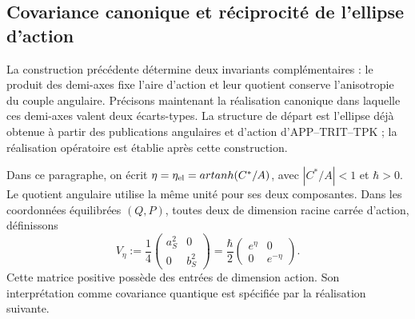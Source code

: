 
\subsection{Covariance canonique et réciprocité de l'ellipse d'action}
\label{ii:sec:ii-area-covarianza}

La construction précédente détermine deux invariants complémentaires :
le produit des demi-axes fixe l'aire d'action et leur quotient conserve
l'anisotropie du couple angulaire. Précisons maintenant la réalisation canonique
dans laquelle ces demi-axes valent deux écarts-types. La structure de
départ est l'ellipse déjà obtenue à partir des publications angulaires et
d'action d'APP--TRIT--TPK ; la réalisation opératoire est établie après
cette construction.

Dans ce paragraphe, on écrit \(\eta=\eta_{\rm el}
=\operatorname{artanh}(C^*/A)\), avec \(|C^*/A|<1\) et
\(\hbar>0\). Le quotient angulaire utilise la même unité pour ses deux
composantes. Dans les coordonnées équilibrées \((Q,P)\), toutes deux de
dimension racine carrée d'action, définissons
\begin{equation}
 V_\eta:=\frac14
 \begin{pmatrix}a_S^2&0\\0&b_S^2\end{pmatrix}
 =\frac{\hbar}{2}
 \begin{pmatrix}e^\eta&0\\0&e^{-\eta}\end{pmatrix}.
 \label{ii:eq:ii-covarianza-geometrica}
\end{equation}
Cette matrice positive possède des entrées de dimension action. Son interprétation
comme covariance quantique est spécifiée par la réalisation suivante.

